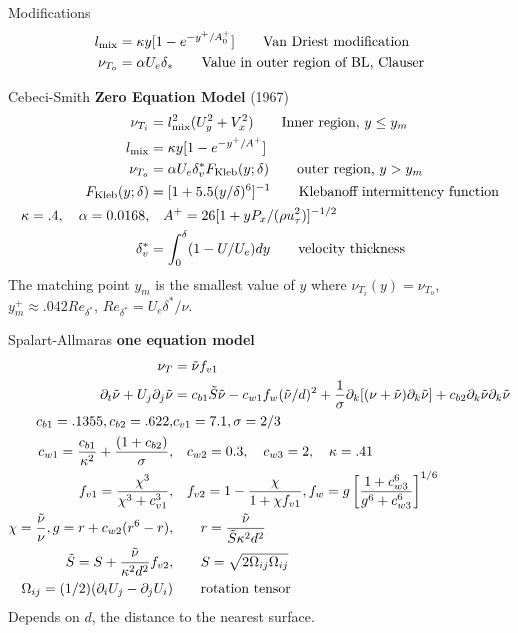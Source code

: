 \documentclass{article}
\begin{document}
Modifications
\begin{align*}
   l_{\rm mix} &= \kappa y [ 1 - e^{ - y^+/A_0^+} ] \qquad\mbox{Van Driest modification} \\
  \nu_{T_o} &= \alpha U_e \delta_*  \qquad\mbox{Value in outer region of BL, Clauser}
\end{align*}


Cebeci-Smith {\bf Zero Equation Model} (1967)
\begin{align*}
   \nu_{T_i} &= l_{\rm mix}^2 ( U_y^2 + V_x^2 )  \qquad\mbox{Inner region, $y\le y_m$} \\
    l_{\rm mix} &= \kappa y [ 1 - e^{ - y^+/A^+} ]  \\
  \nu_{T_o} &= \alpha U_e \delta^*_v F_{\rm Kleb}(y;\delta) \qquad\mbox{outer region, $y>y_m$} \\
  F_{\rm Kleb}(y;\delta) &= [ 1 + 5.5 (y/\delta)^6 ] ^{-1} \qquad \mbox{Klebanoff intermittency function} \\
  \kappa=.4, \quad \alpha=0.0168, & \quad A^+ = 26[ 1 + y P_x /( \rho u_\tau^2) ]^{-1/2} \\
  \delta^*_v &= \int_0^\delta (1- U/U_e) dy \qquad\mbox{velocity thickness} \\
\end{align*}
The matching point $y_m$ is the smallest value of $y$ where $\nu_{T_i}(y)=\nu_{T_o}$,
$y_m^+ \approx .042 Re_{\delta^*}$,  $Re_{\delta^*}= U_e \delta^*/ \nu$.


Spalart-Allmaras {\bf one equation model}
\begin{align*}
  \nu_T &= \tilde{\nu} f_{v1} \\
\partial_t \tilde{\nu} + U_j \partial_j \tilde{\nu} &= c_{b1} \tilde{S} \tilde{\nu}
   - c_{w1} f_w (\tilde{\nu}/d)^2 + {1\over\sigma}  \partial_k[ (\nu+\tilde{\nu})\partial_k\tilde{\nu}]
   + c_{b2} \partial_k \tilde{\nu}\partial_k \tilde{\nu} \\
 c_{b1}=.1355, c_{b2}=.622, & c_{v1}=7.1, \sigma=2/3 \\
 c_{w1} = { c_{b1}\over\kappa^2} + {(1+c_{b2})\over\sigma},& \quad c_{w2}=0.3,\quad c_{w3}=2,\quad \kappa=.41\\
 f_{v1} = {\chi^3 \over \chi^3 + c_{v1}^3} ,& \quad f_{v2} = 1 - {\chi\over 1+\chi f_{v1}}, 
         f_w = g \left[ {1+ c_{w3}^6 \over g^6 +c_{w3}^6 }\right]^{1/6} \\
   \chi = {\tilde{\nu}\over \nu},  g=r+c_{w2}(r^6-r), &\qquad r = {\tilde{\nu}\over \tilde{S}\kappa^2 d^2} \\
 \tilde{S} = S + {\tilde{\nu}\over \kappa^2 d^2} f_{v2}, &\qquad S= \sqrt{ 2 \Omega_{ij}\Omega_{ij}}  \\
\Omega_{ij} = (1/2) ( \partial_i U_j - \partial_j U_i ) & \qquad\mbox{rotation tensor}
\end{align*}
Depends on $d$, the distance to the nearest surface.
            
\end{document}
